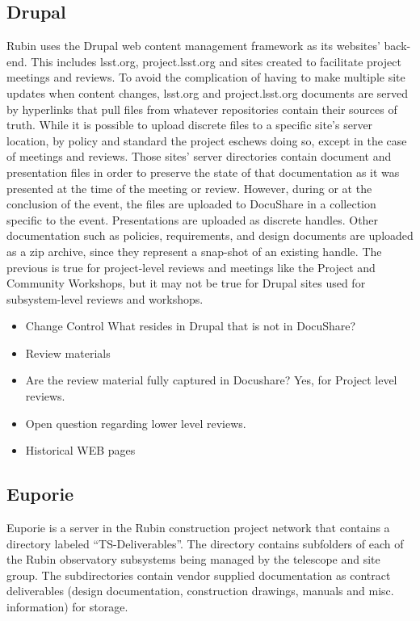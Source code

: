 \subsection{Drupal}

Rubin uses the Drupal web content management framework as its websites’ back-end. This includes lsst.org, project.lsst.org and sites created to facilitate project meetings and reviews. To avoid the complication of having to make multiple site updates when content changes, lsst.org and project.lsst.org documents are served by hyperlinks that pull files from whatever repositories contain their sources of truth. While it is possible to upload discrete files to a specific site’s server location, by policy and standard the project eschews doing so, except in the case of meetings and reviews. Those sites’ server directories contain document and presentation files in order to preserve the state of that documentation as it was presented at the time of the meeting or review. However, during or at the conclusion of the event, the files are uploaded to DocuShare in a collection specific to the event. Presentations are uploaded as discrete handles. Other documentation such as policies, requirements, and design documents are uploaded as a zip archive, since they represent a snap-shot of an existing handle. The previous is true for project-level reviews and meetings like the Project and Community Workshops, but it may not be true for Drupal sites used for subsystem-level reviews and workshops.

\begin{itemize}
	\item Change Control What resides in Drupal that is not in DocuShare?
	\item Review materials
	\item Are the review material fully captured in Docushare?  Yes, for Project level reviews.
	\item Open question regarding lower level reviews.
	\item Historical WEB pages
\end{itemize}

\subsection{Euporie}

Euporie is a server in the Rubin construction project network that contains a directory labeled “TS-Deliverables”. The directory contains subfolders of each of the Rubin observatory subsystems being managed by the telescope and site group. The subdirectories contain vendor supplied documentation as contract deliverables (design documentation, construction drawings, manuals and misc. information) for storage.

